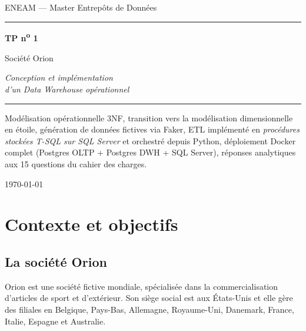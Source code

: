 \documentclass[11pt,a4paper]{article}
\newcounter{question}
\begin{document}

\begin{titlepage}
  \centering
  \vspace*{2cm}
  {\Large\sffamily ENEAM --- Master Entrepôts de Données}\par
  \vspace{0.6cm}
  \rule{0.7\textwidth}{0.6pt}\par
  \vspace{1cm}
  {\Huge\bfseries\sffamily TP n\textsuperscript{o} 1\par}
  \vspace{0.4cm}
  {\LARGE\sffamily Société Orion\par}
  \vspace{0.4cm}
  {\Large\itshape Conception et implémentation\\ d'un Data Warehouse opérationnel\par}
  \vspace{1cm}
  \rule{0.7\textwidth}{0.6pt}\par
  \vspace{1.5cm}
  \begin{minipage}{0.85\textwidth}\centering
    \small
    Modélisation opérationnelle 3NF, transition vers la modélisation
    dimensionnelle en étoile, génération de données fictives via Faker,
    ETL implémenté en \emph{procédures stockées T-SQL sur SQL Server} et
    orchestré depuis Python, déploiement Docker complet (Postgres OLTP +
    Postgres DWH + SQL Server), réponses analytiques aux 15 questions du
    cahier des charges.
  \end{minipage}
  \vfill
  {\sffamily \today}
\end{titlepage}

\tableofcontents
\newpage

\section{Contexte et objectifs}

\subsection{La société Orion}

Orion est une société fictive mondiale, spécialisée dans la commercialisation
d'articles de sport et d'extérieur. Son siège social est aux États-Unis et
elle gère des filiales en Belgique, Pays-Bas, Allemagne, Royaume-Uni,
Danemark, France, Italie, Espagne et Australie.
\end{document}
